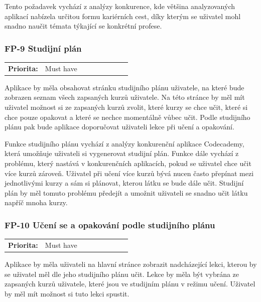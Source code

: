 Tento požadavek vychází z analýzy konkurence, kde většina analyzovaných aplikací nabízela určitou formu kariérních cest, díky kterým se uživatel mohl snadno naučit témata týkající se konkrétní profese.

\subsubsection{FP-9 Studijní plán}\label{sec:fp-study-plan}

\begin{tabular}{lp{0.7\linewidth}}
    \textbf{Priorita:} & Must have \\
\end{tabular}

Aplikace by měla obsahovat stránku studijního plánu uživatele, na které bude zobrazen seznam všech zapsaných kurzů uživatele. Na této stránce by měl mít uživatel možnost si ze zapsaných kurzů zvolit, které kurzy se chce učit, které si chce pouze opakovat a které se nechce momentálně vůbec učit. Podle studijního plánu pak bude aplikace doporučovat uživateli lekce při učení a opakování.

Funkce studijního plánu vychází z analýzy konkurenční aplikace Codecademy, která umožňuje uživateli si vygenerovat studijní plán. Funkce dále vychází z problému, který nastává v konkurenčních aplikacích, pokud se uživatel chce učit více kurzů zároveň. Uživatel při učení více kurzů bývá nucen často přepínat mezi jednotlivými kurzy a sám si plánovat, kterou látku se bude dále učit. Studijní plán by měl tomuto problému předejít a umožnit uživateli se snadno učit látku napříč mnoha kurzy.

\subsubsection{FP-10 Učení se a opakování podle studijního plánu}\label{sec:fp-study-plan-learning}

\begin{tabular}{lp{0.7\linewidth}}
    \textbf{Priorita:} & Must have \\
\end{tabular}

Aplikace by měla uživateli na hlavní stránce zobrazit nadcházející lekci, kterou by se uživatel měl dle jeho studijního plánu učit. Lekce by měla být vybrána ze zapsaných kurzů uživatele, které jsou ve studijním plánu v režimu učení. Uživatel by měl mít možnost si tuto lekci spustit.

